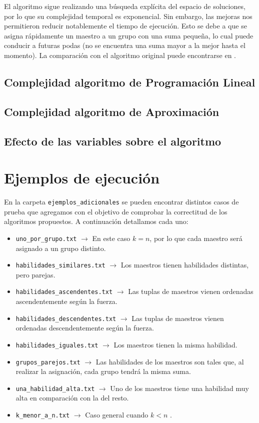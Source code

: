 \documentclass{article}
\begin{document}
\inputminted[linenos, firstline=29, lastline=64]{python}{codigo/backtracking_con_greedy.py}

El algoritmo sigue realizando una búsqueda explícita del espacio de soluciones, por lo que su complejidad temporal es exponencial. Sin embargo, las mejoras nos permitieron reducir notablemente el tiempo de ejecución. Esto se debe a que se asigna rápidamente un maestro a un grupo con una suma pequeña, lo cual puede conducir a futuras podas (no se encuentra una suma mayor a la mejor hasta el momento). La comparación con el algoritmo original puede encontrarse en . 
\subsection{Complejidad algoritmo de Programación Lineal}
\subsection{Complejidad algoritmo de Aproximación}

\subsection{Efecto de las variables sobre el algoritmo}

\section{Ejemplos de ejecución}
\label{sec:ejemplos}

En la carpeta \texttt{ejemplos\_adicionales} se pueden encontrar distintos casos de prueba que agregamos con el objetivo de comprobar la correctitud de los algoritmos propuestos. A continuación detallamos cada uno:
\begin{itemize}
    \item \texttt{uno\_por\_grupo.txt} $\rightarrow$ En este caso $k = n$, por lo que cada maestro será asignado a un grupo distinto.
    \item \texttt{habilidades\_similares.txt} $\rightarrow$ Los maestros tienen habilidades distintas, pero parejas.
    \item \texttt{habilidades\_ascendentes.txt} $\rightarrow$ Las tuplas de maestros vienen ordenadas ascendentemente según la fuerza.
    \item \texttt{habilidades\_descendentes.txt} $\rightarrow$ Las tuplas de maestros vienen ordenadas descendentemente según la fuerza.
    \item \texttt{habilidades\_iguales.txt} $\rightarrow$ Los maestros tienen la misma habilidad.
    \item \texttt{grupos\_parejos.txt} $\rightarrow$ Las habilidades de los maestros son tales que, al realizar la asignación, cada grupo tendrá la misma suma.
    \item \texttt{una\_habilidad\_alta.txt} $\rightarrow$ Uno de los maestros tiene una habilidad muy alta en comparación con la del resto.
    \item \texttt{k\_menor\_a\_n.txt} $\rightarrow$ Caso general cuando $k < n$ .
\end{itemize}
\end{document}
